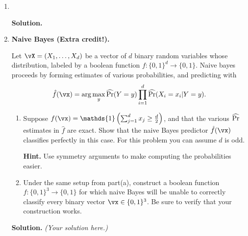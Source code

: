 \documentclass{article}
\def\1{\mathds{1}}
\newcommand{\red}[1]{{\color{red} #1}}
\def\hPr{\widehat{\textup{Pr}}}
\theoremstyle{definition}
\theoremstyle{remark}
\newenvironment{Q}
                {%
                    \clearpage
                \item
                    }
                {%
                    \phantom{s}
                  \bigskip
                  \textbf{Solution.}
                }
\begin{document}
\begin{enumerate}
\begin{Q}
\begin{enumerate}
                     \end{enumerate}
                     \end{Q}

                        \begin{Q}
                            \textbf{Naive Bayes \red{(Extra credit!)}.}
                            
                            Let $\vX = (X_1,\dots,X_d)$ be a vector of $d$ binary random variables whose distribution, labeled by a boolean function $f : \{0,1\}^d \to \{0,1\}$.
                            Naive bayes proceeds by forming estimates of various probabilities,
                            and predicting with
                            \begin{align*}
                            \hat f(\vx) = \arg \max_{y} \hPr(Y=y) \prod_{i=1}^d \hPr( X_i = x_i | Y=y).
                            \end{align*}
                            \begin{enumerate}
        						\item Suppose $f(\vx) = \1\left( \sum_{j=1}^d x_j \geq \frac{d}{2}\right)$, and that the various $\hPr$ estimates in $\hat f$ are exact. Show that the naive Bayes predictor $\hat f (\vx)$ classifies perfectly in this case.  For this problem you can assume $d$ is odd.
        						
        						\textbf{Hint.} Use symmetry arguments to make computing the probabilities easier.
        						\item Under the same setup from part(a), construct a boolean function $f : \{0,1\}^3 \to \{0,1\}$ for which naive Bayes will be unable to correctly classify every binary vector $\vx \in \{0,1\}^3$.  Be sure to verify that your construction works.
        					
                        \end{enumerate}
                    \end{Q}
    \emph{(Your solution here.)}


        	\end{enumerate}


                
\end{document}
